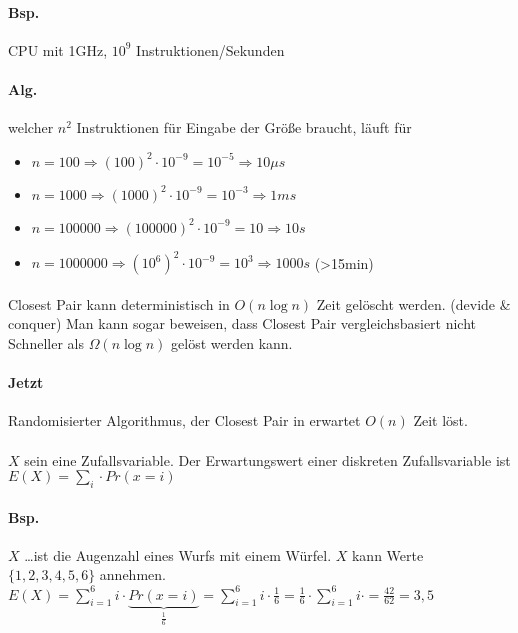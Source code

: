 \paragraph*{Bsp.} CPU mit 1GHz, $10^9$ Instruktionen/Sekunden

\paragraph*{Alg.} welcher $n^2$ Instruktionen für Eingabe der Größe braucht, läuft für
\begin{itemize}
	\item[] $n=100 \Rightarrow (100)^2 \cdot 10^{-9} = 10^{-5} \Rightarrow 10\mu s$
	\item[] $n=1000 \Rightarrow (1000)^2 \cdot 10^{-9} = 10^{-3} \Rightarrow 1ms$
	\item[] $n=100000 \Rightarrow (100000)^2 \cdot 10^{-9} = 10 \Rightarrow 10s$
	\item[] $n=1000000 \Rightarrow (10^6)^2 \cdot 10^{-9} = 10^3 \Rightarrow 1000s$ (>15min)
\end{itemize}

\paragraph*{} Closest Pair kann deterministisch in $O(n \log n)$ Zeit gelöscht werden. (devide \& conquer) %
Man kann sogar beweisen, dass Closest Pair vergleichsbasiert nicht Schneller als $\Omega(n \log n)$ gelöst werden kann.

\paragraph*{Jetzt} Randomisierter Algorithmus, der Closest Pair in erwartet $O(n)$ Zeit löst.

\paragraph*{} $X$ sein eine Zufallsvariable. Der Erwartungswert einer diskreten Zufallsvariable ist $E(X)=\sum\limits_i \cdot Pr(x=i)$

\paragraph*{Bsp.} $X$ \dots ist die Augenzahl eines Wurfs mit einem Würfel. $X$ kann Werte $\{ 1,2,3,4,5,6 \}$ annehmen. $E(X) = \sum\limits_{i=1}^{6} i \cdot \underbrace{Pr(x=i)}_{\frac{1}{6}} = \sum\limits_{i=1}^{6} i \cdot \frac{1}{6} = \frac{1}{6} \cdot \sum\limits_{i=1}^{6} i \cdot = \frac{42}{62} = 3,5$

